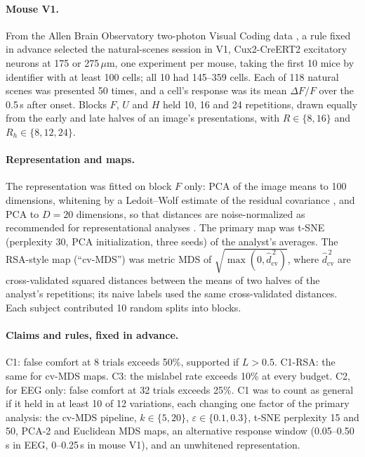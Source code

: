 \documentclass[11pt]{article}
\begin{document}
\paragraph{Mouse V1.} From the Allen Brain Observatory two-photon Visual Coding data
\citep{devries2020}, a rule fixed in advance selected the natural-scenes session in V1,
Cux2-CreERT2 excitatory neurons at 175 or 275\,$\mu$m, one experiment per mouse, taking the first
10 mice by identifier with at least 100 cells; all 10 had 145--359 cells. Each of 118 natural
scenes was presented 50 times, and a cell's response was its mean $\Delta F/F$ over the 0.5\,s
after onset. Blocks $F$, $U$ and $H$ held 10, 16 and 24 repetitions, drawn equally from the early
and late halves of an image's presentations, with $R\in\{8,16\}$ and $R_h\in\{8,12,24\}$.

\paragraph{Representation and maps.} The representation was fitted on block $F$ only: PCA of the
image means to 100 dimensions, whitening by a Ledoit--Wolf estimate of the residual covariance
\citep{ledoit2004}, and PCA to $D=20$ dimensions, so that distances are noise-normalized as
recommended for representational analyses \citep{walther2016,guggenmos2018}. The primary map
was t-SNE (perplexity 30, PCA initialization, three seeds) of the analyst's averages. The
RSA-style map (``cv-MDS'') was metric MDS of $\sqrt{\max(0,\hat d^{\,2}_{\mathrm{cv}})}$, where
$\hat d^{\,2}_{\mathrm{cv}}$ are cross-validated squared distances between the means of two
halves of the analyst's repetitions; its naive labels used the same cross-validated distances.
Each subject contributed 10 random splits into blocks.

\paragraph{Claims and rules, fixed in advance.} C1: false comfort at 8 trials exceeds 50\%,
supported if $L>0.5$. C1-RSA: the same for cv-MDS maps. C3: the mislabel rate exceeds 10\% at
every budget. C2, for EEG only: false comfort at 32 trials exceeds 25\%. C1 was to count as
general if it held in at least 10 of 12 variations, each changing one factor of the primary
analysis: the cv-MDS pipeline, $k\in\{5,20\}$, $\varepsilon\in\{0.1,0.3\}$, t-SNE perplexity 15
and 50, PCA-2 and Euclidean MDS maps, an alternative response window (0.05--0.50\,s in EEG,
0--0.25\,s in mouse V1), and an unwhitened representation.
\end{document}
